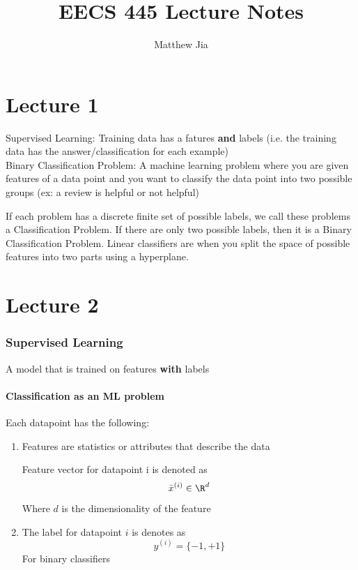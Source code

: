 \documentclass[12pt]{article}
\begin{document}
 
\title{EECS 445 Lecture Notes}
\author{Matthew Jia}
\maketitle

\part{Lecture 1}

Supervised Learning: Training data has a fatures \textbf{and} labels (i.e. the training data has the answer/classification for each example)\\
Binary Classification Problem: A machine learning problem where you are given features of a data point and you want to classify the data point into two possible groups (ex: a review is helpful or not helpful)

If each problem has a discrete finite set of possible labels, we call these problems a Classification Problem. If there are only two possible labels, then it is a Binary Classification Problem. Linear classifiers are when you split the space of possible features into two parts using a hyperplane.

\newpage

\part{Lecture 2}

\section{Supervised Learning}
A model that is trained on features \textbf{with} labels

\subsection{Classification as an ML problem}
Each datapoint has the following:

\begin{enumerate}[label=\arabic*.]
	\item 
		Features are statistics or attributes that describe the data

		Feature vector for datapoint i is denoted as
		\[ \bar{x}^{(i)} \in \R^d \]
		Where $d$ is the dimensionality of the feature
	\item 
		The label for datapoint $i$ is denotes as
		\[ y^{(i)} = \{ -1, +1 \} \]
		For binary classifiers
\end{enumerate}
\end{document}
